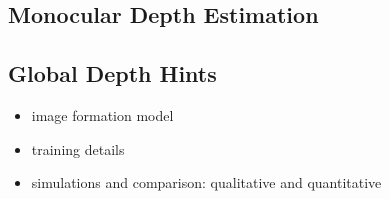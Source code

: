 \subsection{Monocular Depth Estimation} 

\subsection{Global Depth Hints} 

\begin{itemize}
	\item image formation model	
	\item training details
	\item simulations and comparison: qualitative and quantitative
\end{itemize}


